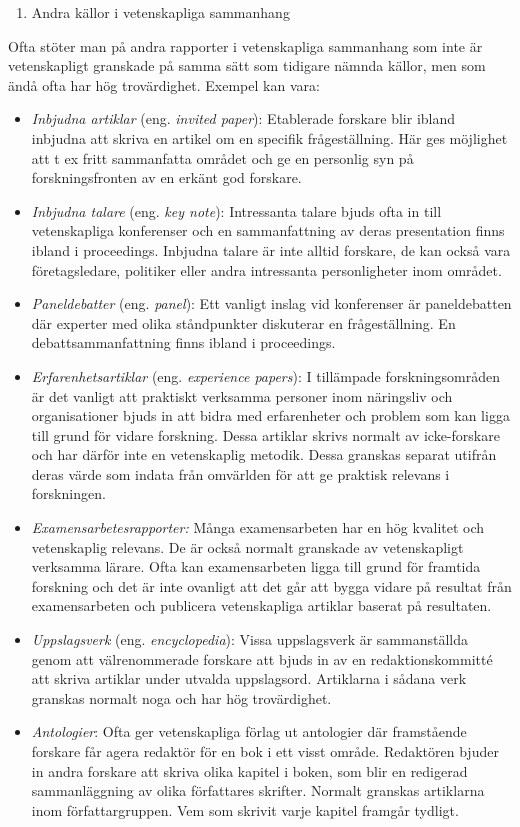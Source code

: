 \begin{enumerate}
\def\labelenumi{\arabic{enumi}.}
\item
  Andra källor i vetenskapliga sammanhang
\end{enumerate}

Ofta stöter man på andra rapporter i vetenskapliga sammanhang som inte
är vetenskapligt granskade på samma sätt som tidigare nämnda källor, men
som ändå ofta har hög trovärdighet. Exempel kan vara:

\begin{itemize}
\item
  \emph{Inbjudna artiklar} (eng. \emph{invited paper}): Etablerade
  forskare blir ibland inbjudna att skriva en artikel om en specifik
  frågeställning. Här ges möjlighet att t ex fritt sammanfatta området
  och ge en personlig syn på forskningsfronten av en erkänt god
  forskare.
\item
  \emph{Inbjudna talare} (eng. \emph{key note}): Intressanta talare
  bjuds ofta in till vetenskapliga konferenser och en sammanfattning av
  deras presentation finns ibland i proceedings. Inbjudna talare är inte
  alltid forskare, de kan också vara företagsledare, politiker eller
  andra intressanta personligheter inom området.
\item
  \emph{Paneldebatter} (eng. \emph{panel}): Ett vanligt inslag vid
  konferenser är paneldebatten där experter med olika ståndpunkter
  diskuterar en frågeställning. En debattsammanfattning finns ibland i
  proceedings.
\item
  \emph{Erfarenhetsartiklar} (eng. \emph{experience papers}): I
  tillämpade forskningsområden är det vanligt att praktiskt verksamma
  personer inom näringsliv och organisationer bjuds in att bidra med
  erfarenheter och problem som kan ligga till grund för vidare
  forskning. Dessa artiklar skrivs normalt av icke-forskare och har
  därför inte en vetenskaplig metodik. Dessa granskas separat utifrån
  deras värde som indata från omvärlden för att ge praktisk relevans i
  forskningen.
\item
  \emph{Examensarbetesrapporter:} Många examensarbeten har en hög
  kvalitet och vetenskaplig relevans. De är också normalt granskade av
  vetenskapligt verksamma lärare. Ofta kan examensarbeten ligga till
  grund för framtida forskning och det är inte ovanligt att det går att
  bygga vidare på resultat från examensarbeten och publicera
  vetenskapliga artiklar baserat på resultaten.
\item
  \emph{Uppslagsverk} (eng. \emph{encyclopedia}): Vissa uppslagsverk är
  sammanställda genom att välrenommerade forskare att bjuds in av en
  redaktionskommitté att skriva artiklar under utvalda uppslagsord.
  Artiklarna i sådana verk granskas normalt noga och har hög
  trovärdighet.
\item
  \emph{Antologier}: Ofta ger vetenskapliga förlag ut antologier där
  framstående forskare får agera redaktör för en bok i ett visst område.
  Redaktören bjuder in andra forskare att skriva olika kapitel i boken,
  som blir en redigerad sammanläggning av olika författares skrifter.
  Normalt granskas artiklarna inom författargruppen. Vem som skrivit
  varje kapitel framgår tydligt.
\end{itemize}

